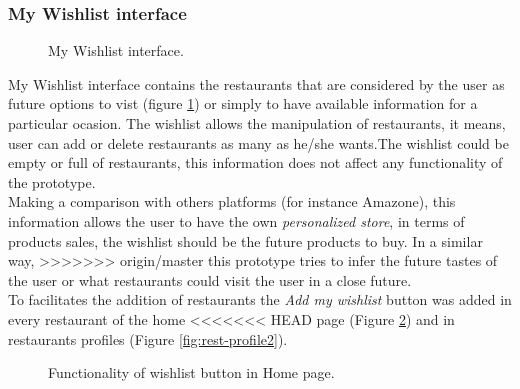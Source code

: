 \subsubsection{My Wishlist interface}
\begin{figure}
\captionsetup{font=footnotesize}
\centering
{}
\caption{My Wishlist interface.}
\label{fig:mywishlist}   
\end{figure}
My Wishlist interface contains the restaurants that are 
considered by the user as future options to vist (figure \ref{fig:mywishlist}) 
or simply to have available information for a particular 
ocasion. The wishlist allows the manipulation of restaurants, 
it means, user can add or delete restaurants as many as 
he/she wants.The wishlist could be empty or full of 
restaurants, this information does not affect any functionality 
of the prototype. \\
Making a comparison with others platforms (for instance 
Amazone), this information allows the user to have the own 
\textit{personalized store}, in terms of products sales, the wishlist 
should be the future products to buy. In a similar way, 
>>>>>>> origin/master
this prototype tries to infer the future tastes of the user 
or what restaurants could visit the user in a close future. \\
To facilitates the addition of restaurants the \textit{Add my wishlist} 
button was added in every restaurant of the home 
<<<<<<< HEAD
page (Figure  \ref{fig:wishlist-home}) and in restaurants 
profiles (Figure  \ref{fig:rest-profile2}).
\begin{figure}
\captionsetup{font=footnotesize}
\centering
{}
\caption{Functionality of wishlist button in Home page.}
\label{fig:wishlist-home}   
\end{figure}

